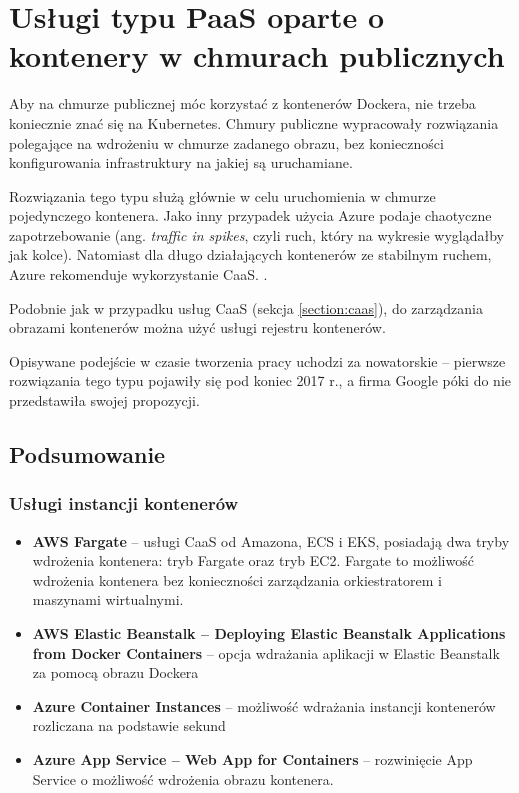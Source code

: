 \documentclass[12pt,a4paper,twoside,titlepage,openright]{book}
\begin{document}
\section{Usługi typu PaaS oparte o kontenery w chmurach publicznych}

Aby na chmurze publicznej móc korzystać z kontenerów Dockera, nie trzeba koniecznie znać się na Kubernetes. Chmury publiczne wypracowały rozwiązania polegające na wdrożeniu w chmurze zadanego obrazu, bez konieczności konfigurowania infrastruktury na jakiej są uruchamiane.

Rozwiązania tego typu służą głównie w celu uruchomienia w chmurze pojedynczego kontenera. Jako inny przypadek użycia Azure podaje chaotyczne zapotrzebowanie (ang. \textit{traffic in spikes}, czyli ruch, który na wykresie wyglądałby jak kolce). Natomiast dla długo działających kontenerów ze stabilnym ruchem, Azure rekomenduje wykorzystanie CaaS. \cite{siteAzureContainerInstances}.

Podobnie jak w przypadku usług CaaS (sekcja \ref{section:caas}), do zarządzania obrazami kontenerów można użyć usługi rejestru kontenerów.

Opisywane podejście w czasie tworzenia pracy uchodzi za nowatorskie -- pierwsze rozwiązania tego typu pojawiły się pod koniec 2017 r., a firma Google póki do nie przedstawiła swojej propozycji.

\subsection*{Podsumowanie}

\subsubsection{Usługi instancji kontenerów}

\begin{itemize}
\item \textbf{AWS Fargate} -- usługi CaaS od Amazona, ECS i EKS, posiadają dwa tryby wdrożenia kontenera: tryb Fargate oraz tryb EC2. Fargate to możliwość wdrożenia kontenera bez konieczności zarządzania orkiestratorem i maszynami wirtualnymi. \cite{siteAwsFargate}
\item \textbf{AWS Elastic Beanstalk -- Deploying Elastic Beanstalk Applications from Docker Containers} -- opcja wdrażania aplikacji w Elastic Beanstalk za pomocą obrazu Dockera 
\item \textbf{Azure Container Instances} -- możliwość wdrażania instancji kontenerów rozliczana na podstawie sekund \cite{siteAzureContainerInstances}
\item \textbf{Azure App Service -- Web App for Containers} -- rozwinięcie App Service o możliwość wdrożenia obrazu kontenera.
\end{itemize}
\end{document}

